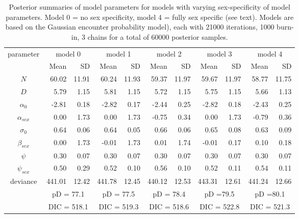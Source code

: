 \begin{table}[ht]
\centering
\caption{
Posterior summaries of model parameters for models with varying
sex-specificity of model parameters. Model 0 = no sex specificity,
model 4 = fully sex specific (see text). Models are based on the 
 Gaussian encounter probability model), each with 21000 iterations,
 1000 burn-in, 3 chains for a total of 60000 posterior samples. }
{\tiny
\begin{tabular}{crrrrrrrrrr} \hline \hline
parameter & \multicolumn{2}{c}{model 0} &
\multicolumn{2}{c}{model 1} &
\multicolumn{2}{c}{model 2} &
\multicolumn{2}{c}{model 3} &
\multicolumn{2}{c}{model 4}  \\
          &    Mean &   SD &      Mean &   SD &      Mean &   SD &
          Mean&     SD  & Mean & SD \\ \hline
$N$       &  60.02& 11.91&  60.24& 11.93&  59.37& 11.97&  59.67& 11.97&  58.77& 11.75\\
$D$       &   5.79&  1.15&   5.81&  1.15&   5.72&  1.15&   5.75&  1.15&   5.66&  1.13\\
$\alpha_0$&  -2.81&  0.18&  -2.82&  0.17&  -2.44&  0.25&  -2.82&  0.18&  -2.43&  0.25\\
$\alpha_{sex}$ &   0.00&  1.73&   0.00&  1.73&  -0.75&  0.34&   0.00&  1.73&  -0.79&  0.36\\
$\sigma_0$    &  0.64&  0.06&   0.64&  0.05&   0.66&  0.06&   0.65&  0.08&   0.63&  0.09\\
$\beta_{sex} $ &  0.00&  1.73&  -0.01&  1.73&   0.01&  1.74&  -0.01&  0.17&   0.10&  0.18\\
$\psi$         &0.30&  0.07&   0.30&  0.07&   0.30&  0.07&   0.30&  0.07&   0.30&  0.07\\
$\psi_{sex}$    & 0.50&  0.29&   0.52&  0.10&   0.56&  0.10&   0.52&  0.11&   0.54&  0.11\\
deviance   &441.01& 12.42& 441.78& 12.45& 440.12& 12.53& 443.31& 12.61&441.24& 12.66 \\
& \multicolumn{2}{c}{pD = 77.1} &\multicolumn{2}{c}{pD = 77.5} & \multicolumn{2}{c}{pD = 78.4}& \multicolumn{2}{c}{pD =79.5}  & \multicolumn{2}{c}{pD =80.1}  \\
& \multicolumn{2}{c}{DIC = 518.1} & \multicolumn{2}{c}{DIC = 519.3} &\multicolumn{2}{c}{DIC = 518.6} &    \multicolumn{2}{c}{DIC = 522.8} &\multicolumn{2}{c}{DIC = 521.3} \\ \hline
\end{tabular}
}
\label{gof.tab.dic}
\end{table}





